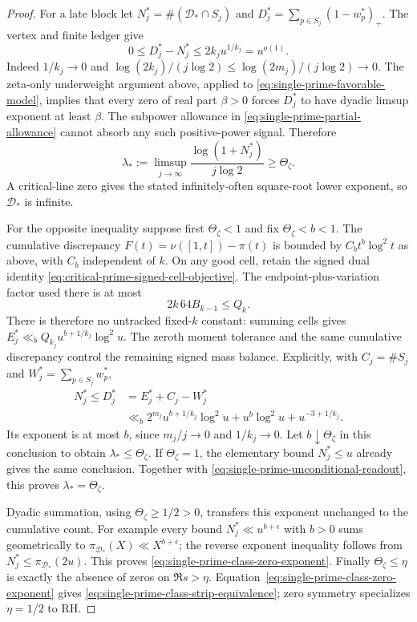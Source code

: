 \documentclass[11pt]{article}
\theoremstyle{definition}
\begin{document}
\begin{proof}
For a late block let $N_j^*=\#(\mathcal D_*\cap S_j)$ and
$D_j^*=\sum_{p\in S_j}(1-w_p^*)_+$.
The vertex and finite ledger give
\begin{equation}
 0\le D_j^*-N_j^*
       \le2k_j u^{1/k_j}=u^{o(1)} .
 \label{eq:single-prime-partial-allowance}
\end{equation}
Indeed $1/k_j\to0$ and
$\log(2k_j)/(j\log2)\le\log(2m_j)/(j\log2)\to0$.
The zeta-only underweight argument above, applied to
\eqref{eq:single-prime-favorable-model}, implies that every
zero of real part $\beta>0$ forces $D_j^*$ to have dyadic
limsup exponent at least $\beta$. The subpower allowance
in \eqref{eq:single-prime-partial-allowance} cannot absorb
any such positive-power signal. Therefore
\begin{equation}
 \lambda_*:=\limsup_{j\to\infty}
       \frac{\log(1+N_j^*)}{j\log2}\ge\Theta_\zeta .
 \label{eq:single-prime-unconditional-readout}
\end{equation}
A critical-line zero gives the stated infinitely-often
square-root lower exponent, so $\mathcal D_*$ is infinite.

For the opposite inequality suppose first $\Theta_\zeta<1$
and fix $\Theta_\zeta<b<1$.
The cumulative discrepancy $F(t)=\nu([1,t])-\pi(t)$ is
bounded by $C_b t^b\log^2t$ as above, with $C_b$ independent
of $k$. On any good cell, retain the signed dual identity
\eqref{eq:critical-prime-signed-cell-objective}.
The endpoint-plus-variation factor used there is at most
\[
                  2k\,64B_{k-1}\le Q_k .
\]
There is therefore no untracked fixed-$k$ constant:
summing cells gives
$E_j^*\ll_b Q_{k_j}u^{b+1/k_j}\log^2u$.
The zeroth moment tolerance and the same cumulative
discrepancy control the remaining signed mass balance.
Explicitly, with $C_j=\#S_j$ and $W_j^*=\sum_{p\in S_j}w_p^*$,
\begin{equation}
 \begin{aligned}
 N_j^*\le D_j^*
    &=E_j^*+C_j-W_j^*\\
    &\ll_b
      2^{m_j}u^{b+1/k_j}\log^2u
                         +u^b\log^2u+u^{-3+1/k_j}.
 \end{aligned}
 \label{eq:single-prime-full-signed-upper-bound}
\end{equation}
Its exponent is at most $b$, since
$m_j/j\to0$ and $1/k_j\to0$.
Let $b\downarrow\Theta_\zeta$ in this conclusion to obtain
$\lambda_*\le\Theta_\zeta$.
If $\Theta_\zeta=1$, the elementary bound $N_j^*\le u$
already gives the same conclusion.
Together with \eqref{eq:single-prime-unconditional-readout},
this proves $\lambda_*=\Theta_\zeta$.

Dyadic summation, using $\Theta_\zeta\ge1/2>0$, transfers
this exponent unchanged to the cumulative count.
For example every bound $N_j^*\ll u^{b+\epsilon}$ with
$b>0$ sums geometrically to
$\pi_{\mathcal D_*}(X)\ll X^{b+\epsilon}$;
the reverse exponent inequality follows from
$N_j^*\le\pi_{\mathcal D_*}(2u)$.
This proves \eqref{eq:single-prime-class-zero-exponent}.
Finally $\Theta_\zeta\le\eta$ is exactly the absence of
zeros on $\Re s>\eta$.
Equation~\eqref{eq:single-prime-class-zero-exponent} gives
\eqref{eq:single-prime-class-strip-equivalence};
zero symmetry specializes $\eta=1/2$ to RH.
\end{proof}
\end{document}
